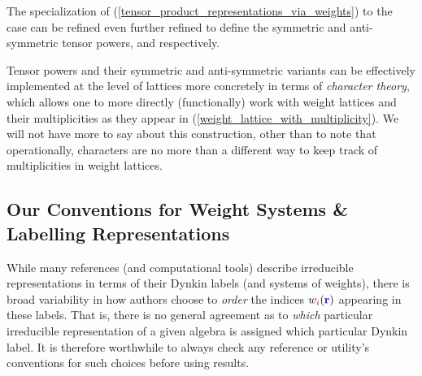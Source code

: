\documentclass[12pt,a4paper]{article}\let\ifpdf\relax
\begin{document}
The specialization of (\ref{tensor_product_representations_via_weights}) to the case
%
%
can be refined even further refined to define the symmetric and anti-symmetric tensor powers,
%
%
and 
%
%
respectively. 

Tensor powers and their symmetric and anti-symmetric variants can be effectively implemented at the level of lattices more concretely in terms of \emph{character theory}, which allows one to more directly (functionally) work with weight lattices and their multiplicities as they appear in (\ref{weight_lattice_with_multiplicity}).  We will not have more to say about this construction, other than to note that operationally, characters are no more than a different way to keep track of multiplicities in weight lattices. 



\vspace{\fill}
\subsection{Our Conventions for Weight Systems \& Labelling Representations}\label{subsec:conventions_for_weight_systems}\vspace{-4pt}

While many references (and computational tools) describe irreducible representations in terms of their Dynkin labels (and systems of weights), there is broad variability in how authors choose to \emph{order} the indices $w_{\r{i}}(\mathbf{\b{r}})$ appearing in these labels. That is, there is no general agreement as to \emph{which} particular irreducible representation of a given algebra is assigned which particular Dynkin label. It is therefore worthwhile to always check any reference or utility's conventions for such choices before using results. 
\end{document}
